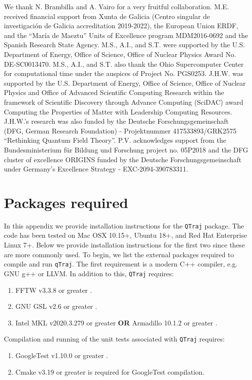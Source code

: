 \documentclass[times,sort&compress,final]{elsarticle}
\def\qtraj{{\tt QTraj} }
\begin{document}
We thank N. Brambilla and A. Vairo for a very fruitful  collaboration.
M.E. received financial support from Xunta de Galicia (Centro singular de investigación de Galicia accreditation 2019-2022), the European Union ERDF, and the “María de Maeztu” Units of Excellence program MDM2016-0692 and the Spanish Research State Agency.
M.S., A.I., and S.T. were supported by the U.S. Department of Energy, Office of Science, Office of Nuclear Physics Award No. DE-SC0013470. 
M.S., A.I., and S.T. also thank the Ohio Supercomputer Center for computational time under the auspices of Project No. PGS0253. 
J.H.W. was supported by the U.S. Department of Energy, Office of Science, Office of Nuclear Physics and Office of Advanced Scientific Computing Research within the framework of Scientific Discovery through Advance Computing (SciDAC) award Computing the Properties of Matter with Leadership Computing Resources. 
J.H.W.’s research was also funded by the Deutsche Forschungsgemeinschaft (DFG, German Research Foundation) - Projektnummer 417533893/GRK2575 “Rethinking Quantum Field Theory”. 
P.V. acknowledges support from the Bundesministerium für Bildung und Forschung project no. 05P2018 and the DFG cluster of excellence ORIGINS funded by the Deutsche Forschungsgemeinschaft under Germany’s Excellence Strategy - EXC-2094-390783311. 

\appendix

\section{Packages required}
\label{sec:requirements}

In this appendix we provide installation instructions for the \qtraj package.  The code has been tested on Mac OSX 10.15+, Ubuntu 18+, and Red Hat Enterprise Linux 7+.  Below we provide installation instructions for the first two since these are more commonly used.  To begin, we list the external packages required to compile and run {\tt qTraj}.  The first requirement is a modern C++ compiler, e.g. GNU g++ or LLVM.  In addition to this, \qtraj requires:
%
\begin{enumerate}
\item FFTW v3.3.8 or greater \cite{FFTW}.
\item GNU GSL v2.6 or greater \cite{GSL}.
\item Intel MKL v2020.3.279 or greater \cite{IntelOneAPI} {\bf OR} Armadillo 10.1.2 or greater \cite{Armadillo}.
\end{enumerate}
%
Compilation and running of the unit tests associated with \qtraj requires:
%
\begin{enumerate}
\item GoogleTest v1.10.0 or greater \cite{Googletest}.
\item Cmake v3.19 \cite{cmake} or greater is required for GoogleTest compilation.
\end{enumerate}
\end{document}
